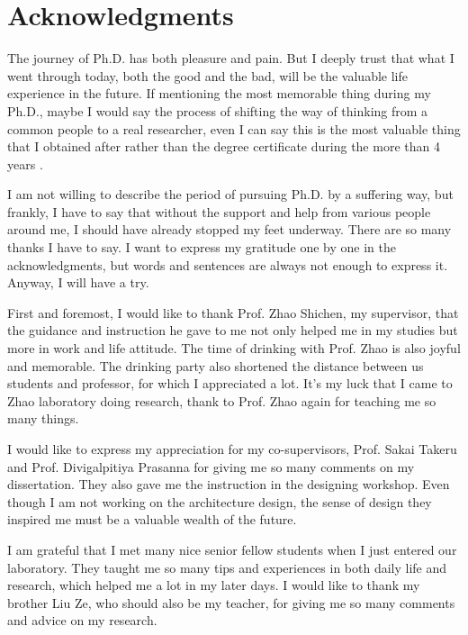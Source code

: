 \documentclass[12pt, twoside, a4paper]{book} %
\renewcommand{\baselinestretch}{1.5} %
\begin{document}
\frontmatter

\renewcommand{\baselinestretch}{1.5} %
\fontsize{13pt}{13pt} %
\selectfont

\chapter{Acknowledgments}
The journey of Ph.D. has both pleasure and pain. But I deeply trust that what I went through today, both the good and the bad, will be the valuable life experience in the future. If mentioning the most memorable thing during my Ph.D., maybe I would say the process of shifting the way of thinking from a common people to a real researcher, even I can say this is the most valuable thing that I obtained after rather than the degree certificate during the more than 4 years .

I am not willing to describe the period of pursuing Ph.D. by a suffering way, but frankly, I have to say that without the support and help from various people around me, I should have already stopped my feet underway. There are so many thanks I have to say. I want to express my gratitude one by one in the acknowledgments, but words and sentences are always not enough to express it. Anyway, I will have a try.

First and foremost, I would like to thank Prof. Zhao Shichen, my supervisor, that the guidance and instruction he gave to me not only helped me in my studies but more in work and life attitude. The time of drinking with Prof. Zhao is also joyful and memorable. The drinking party also shortened the distance between us students and professor, for which I appreciated a lot. It's my luck that I came to Zhao laboratory doing research, thank to Prof. Zhao again for teaching me so many things.

I would like to express my appreciation for my co-supervisors, Prof. Sakai Takeru and Prof. Divigalpitiya Prasanna for giving me so many comments on my dissertation. They also gave me the instruction in the designing workshop. Even though I am not working on the architecture design, the sense of design they inspired me must be a valuable wealth of the future.

I am grateful that I met many nice senior fellow students when I just entered our laboratory. They taught me so many tips and experiences in both daily life and research, which helped me a lot in my later days. I would like to thank my brother Liu Ze, who should also be my teacher, for giving me so many comments and advice on my research. 
\end{document}
